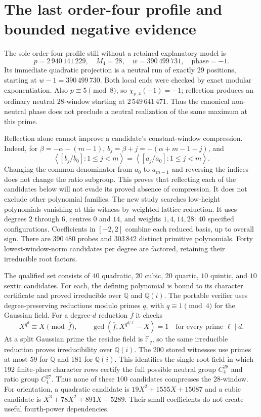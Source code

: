 \documentclass[11pt]{article}
\theoremstyle{definition}\newtheorem{definition}[theorem]{Definition}
\newcommand{\Q}{\mathbb Q}
\begin{document}
\section{The last order-four profile and bounded negative evidence}\label{sec:residual}
The sole order-four profile still without a retained explanatory
model is
\[
 p=2\,940\,141\,229,\quad M_4=28,\quad
w=390\,499\,731,\quad\text{phase}=-1.
\]
Its immediate quadratic projection is a neutral run of exactly
$29$ positions, starting at $w-1=390\,499\,730$. Both local ends
were checked by exact modular exponentiation. Also
$p\equiv5\pmod8$, so $\chi_{p,4}(-1)=-1$; reflection produces an
ordinary neutral $28$-window starting at $2\,549\,641\,471$.
Thus the canonical non-neutral phase does not preclude a neutral
realization of the same maximum at this prime.

Reflection alone cannot improve a candidate's constant-window
compression. Indeed, for $\beta=-\alpha-(m-1)$,
$b_j=\beta+j=-(\alpha+m-1-j)$, and
\[
 \left\langle[b_j/b_0]:1\le j<m\right\rangle
 =\left\langle[a_j/a_0]:1\le j<m\right\rangle.
\]
Changing the common denominator from $a_0$ to $a_{m-1}$ and
reversing the indices does not change the ratio subgroup.
This proves that reflecting each of the candidates below will
not evade its proved absence of compression. It does not exclude
other polynomial families.
The new study searches low-height polynomials vanishing at this
witness by weighted lattice reduction. It uses degrees $2$ through
$6$, centres $0$ and $14$, and weights $1,4,14,28$:
$40$ specified configurations. Coefficients in $[-2,2]$ combine
each reduced basis, up to overall sign. There are $390\,480$
probes and $303\,842$ distinct primitive polynomials. Forty
lowest-window-norm candidates per degree are factored, retaining
their irreducible root factors.

The qualified set consists of $40$ quadratic, $20$ cubic,
$20$ quartic, $10$ quintic, and $10$ sextic candidates. For each,
the defining polynomial is bound to its character certificate and
proved irreducible over $\Q$ and $\Q(i)$. The portable verifier
uses degree-preserving reductions modulo primes $q$, with
$q\equiv1\pmod4$ for the Gaussian field. For a degree-$d$ reduction
$\overline f$ it checks
\[
 X^{q^d}\equiv X\pmod{\overline f},\qquad
 \gcd(\overline f,X^{q^{d/\ell}}-X)=1
 \quad\text{for every prime }\ell\mid d.
\]
At a split Gaussian prime the residue field is $\mathbb F_q$,
so the same irreducible reduction proves irreducibility over $\Q(i)$.
The 200 stored witnesses use primes at most 59 for $\Q$ and
181 for $\Q(i)$. This identifies the single root field in which
$192$ finite-place character rows certify the full possible
neutral group $C_4^{28}$ and ratio group $C_4^{27}$.
Thus none of these $100$ candidates compresses the $28$-window.
For orientation, a quadratic candidate is
$19X^2+1555X+15087$ and a cubic candidate is
$X^3+78X^2+891X-5289$. Their small coefficients do not create
useful fourth-power dependencies.
\end{document}
